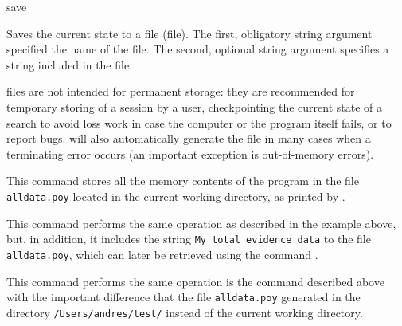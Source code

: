 \begin{command}{save}{}

	\syntax{\obligatory{(\poystring \optional{, \poystring})}}

	\begin{poydescription}
            Saves the current \poy state to a file (\poy file). The first, obligatory string argument
            specified the name of the \poy file. The second, optional string argument specifies a
            string included in the \poy file. 

            \poy files are not intended for permanent storage: they are recommended
            for temporary storing of a \poy session by a user, checkpointing the
            current state of a search to avoid loss work in case the computer or the
            program itself fails, or to report bugs. \poy will also automatically
            generate the file in many cases when a terminating error occurs (an
            important exception is out-of-memory errors). 
	\end{poydescription}

    \begin{poyexamples}
            {This command stores all the memory contents of the program in the file
            \texttt{alldata.poy} located in the current working directory, as
            printed by .}

            {This command performs the same operation as described in the example above,
            but, in addition, it includes the string \texttt{My total
            evidence data} to the file \texttt{alldata.poy},
            which can later be retrieved using the command .}

            {This command performs the same operation is the command described above
            with the important difference that the file \texttt{alldata.poy} generated in the
            directory \texttt{/Users/andres/test/} instead of the current working directory.}
    \end{poyexamples}

    \begin{poyalso}
    \end{poyalso}

\end{command}

